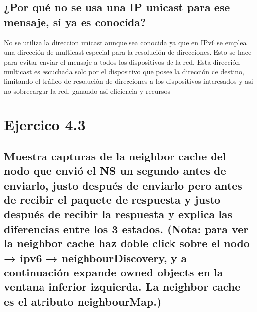 \subsection{¿Por qué no se usa una IP unicast para ese mensaje, si ya es conocida?}

No se utiliza la direccion unicast aunque sea conocida ya que en IPv6 se emplea una dirección de multicast especial para la resolución de direcciones. Esto se hace para evitar enviar el mensaje a todos los dispositivos de la red. Esta dirección multicast es escuchada solo por el dispositivo que posee la dirección de destino, limitando el tráfico de resolución de direcciones a los dispositivos interesados y asi no sobrecargar la red, ganando asi eficiencia y recursos.


\section{Ejercico 4.3}
\subsection{Muestra capturas de la neighbor cache del nodo que envió el NS un segundo antes de enviarlo, justo después de enviarlo pero antes de recibir el paquete de respuesta y justo después de recibir la respuesta y explica las diferencias entre los 3 estados. (Nota: para ver la neighbor cache haz doble click sobre el nodo → ipv6 → neighbourDiscovery, y a continuación expande owned objects en la ventana inferior izquierda. La neighbor cache es el atributo neighbourMap.)}


